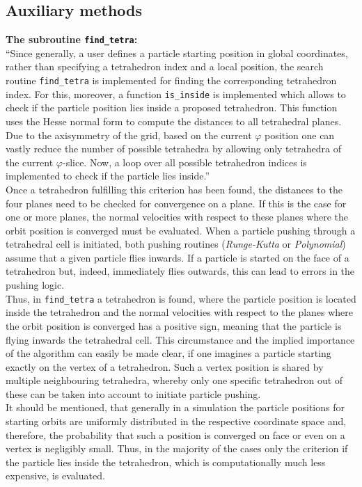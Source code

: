 \documentclass{TheMartianReport}
\begin{document}
\subsection{Auxiliary methods}
\label{ssec:auxiliary_methods}

\textbf{The subroutine \texttt{find\_tetra}:}\\
``Since generally, a user defines a particle starting position in global coordinates, rather than specifying a tetrahedron index and a local position, the search routine \texttt{find\_tetra} is implemented for finding the corresponding tetrahedron index. For this, moreover, a function \texttt{is\_inside} is implemented which allows to check if the particle position lies inside a proposed tetrahedron. This function uses the Hesse normal form to compute the distances to all tetrahedral planes.  Due to the axisymmetry of the grid, based on the current $\varphi$ position one can vastly reduce the number of possible tetrahedra by allowing only tetrahedra of the current $\varphi$-slice. Now, a loop over all possible tetrahedron indices is implemented to check if the particle lies inside.''\cite{bauer_master_2020}\\
%
Once a tetrahedron fulfilling this criterion has been found, the distances to the four planes need to be checked for convergence on a plane.  If this is the case for one or more planes, the normal velocities with respect to these planes where the orbit position is converged must be evaluated. When a particle pushing through a tetrahedral cell is initiated, both pushing routines (\textit{Runge-Kutta} or \textit{Polynomial}) assume that a given particle flies inwards. If a particle is started on the face of a tetrahedron but, indeed, immediately flies outwards, this can lead to errors in the pushing logic. \\
%
Thus,  in \texttt{find\_tetra} a tetrahedron is found, where the particle position is located inside the tetrahedron and the normal velocities with respect to the planes where the orbit position is converged has a positive sign, meaning that the particle is flying inwards the tetrahedral cell.
This circumstance and the implied importance of the algorithm can easily be made clear, if one imagines a particle starting exactly on the vertex of a tetrahedron. Such a vertex position is shared by multiple neighbouring tetrahedra, whereby only one specific tetrahedron out of these can be taken into account to initiate particle pushing.\\
%
It should be mentioned, that generally in a simulation the particle positions for starting orbits are uniformly distributed in the respective coordinate space and, therefore, the probability that such a position is converged on face or even on a vertex is negligibly small. Thus, in the majority of the cases only the criterion if the particle lies inside the tetrahedron, which is computationally much less expensive, is evaluated.\\
\end{document}
